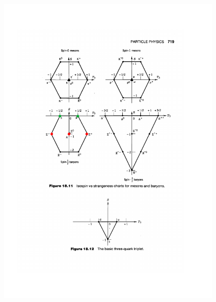 \documentclass[../main.tex]{subfiles}
\begin{document}
\begin{figure}[h!]
	\includegraphics{images/krane_733_c.pdf}
	\caption[]{}
\end{figure}
\end{document}
